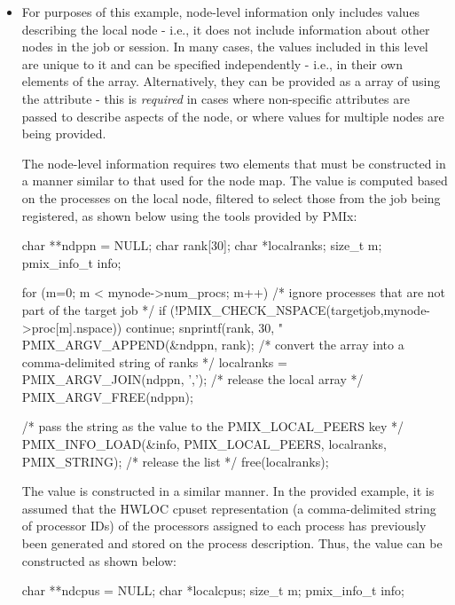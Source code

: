 \begin{itemize}
\item For purposes of this example, node-level information only includes values describing the local node - i.e., it does not include information about other nodes in the job or session. In many cases, the values included in this level are unique to it and can be specified independently - i.e., in their own  elements of the  array. Alternatively, they can be provided as a  array of  using the  attribute - this is \emph{required} in cases where non-specific attributes are passed to describe aspects of the node, or where values for multiple nodes are being provided.

The node-level information requires two elements that must be constructed in a manner similar to that used for the node map. The  value is computed based on the processes on the local node, filtered to select those from the job being registered, as shown below using the tools provided by \ac{PMIx}:

\cspecificstart
\begin{codepar}
char **ndppn = NULL;
char rank[30];
char *localranks;
size_t m;
pmix_info_t info;

for (m=0; m < mynode->num_procs; m++) {
    /* ignore processes that are not part of the target job */
    if (!PMIX_CHECK_NSPACE(targetjob,mynode->proc[m].nspace)) {
        continue;
    }
    snprintf(rank, 30, "%
    PMIX_ARGV_APPEND(&ndppn, rank);
}
/* convert the array into a comma-delimited string of ranks */
localranks = PMIX_ARGV_JOIN(ndppn, ',');
/* release the local array */
PMIX_ARGV_FREE(ndppn);

/* pass the string as the value to the PMIX_LOCAL_PEERS key */
PMIX_INFO_LOAD(&info, PMIX_LOCAL_PEERS, localranks, PMIX_STRING);
/* release the list */
free(localranks);

\end{codepar}
\cspecificend

The  value is constructed in a similar manner. In the provided example, it is assumed that the \ac{HWLOC} cpuset representation (a comma-delimited string of processor IDs) of the processors assigned to each process has previously been generated and stored on the process description. Thus, the value can be constructed as shown below:

\cspecificstart
\begin{codepar}
char **ndcpus = NULL;
char *localcpus;
size_t m;
pmix_info_t info;


\end{codepar}
\end{itemize}
